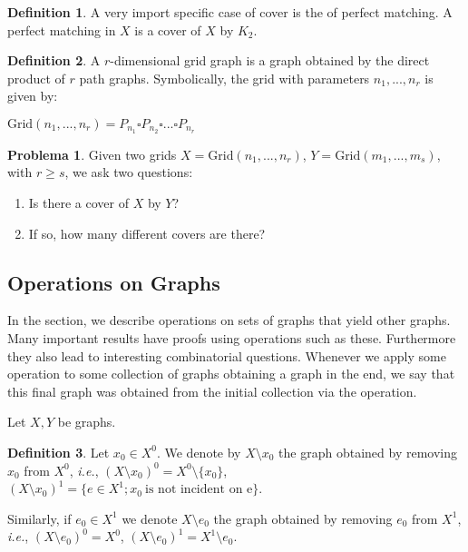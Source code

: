 \documentclass[]{article}
\theoremstyle{definition}
\newtheorem{definition}{Definition}[section]
\newtheorem{problem}{Problema}[section]
\theoremstyle{definition}
\newcommand{\ie}{\textit{i.e.}}
\begin{document}
\begin{definition}
	A very import specific case of cover is the of perfect matching. A perfect matching in $X$ is a cover of $X$ by $K_2$.
\end{definition}

\begin{definition}
	A $r$-dimensional grid graph is a graph obtained by the direct product of $r$ path graphs. Symbolically, the grid with parameters $n_1, ..., n_r$ is given by:
	
	\begin{center}
		$\text{Grid}(n_1, ..., n_r) = P_{n_1}\square P_{n_2} \square... \square P_{n_r}$
	\end{center}
	
\end{definition}

\begin{problem}
	Given two grids $X = \text{Grid}(n_1, ..., n_r)$, $Y = \text{Grid}(m_1, ..., m_s)$, with $r \geq s$, we ask two questions:
	
	\begin{enumerate}
		\item Is there a cover of $X$ by $Y$?
		
		\item If so, how many different covers are there?
	\end{enumerate}	
\end{problem}

\subsection{Operations on Graphs}

In the section, we describe operations on sets of graphs that yield other graphs. Many important results have proofs using operations such as these. Furthermore they also lead to interesting combinatorial questions. Whenever we apply some operation to some collection of graphs obtaining a graph in the end, we say that this final graph was obtained from the initial collection via the operation.

Let $X, Y$ be graphs. 

\begin{definition}
	Let $x_0 \in X^0$. We denote by $X \setminus x_0$ the graph obtained by removing $x_0$ from $X^0$, \ie, $(X \setminus x_0)^0 = X^0 \setminus \{x_0\}$, $(X \setminus x_0)^1 = \{e \in X^1; x_0 \ \text{is not incident on e} \}$.
	
	Similarly, if $e_0 \in X^1$ we denote $X \setminus e_0$ the graph obtained by removing $e_0$ from $X^1$, \ie, $(X \setminus e_0)^0 = X^0$, $(X \setminus e_0)^1 = X^1 \setminus e_0$.
\end{definition}
\end{document}
